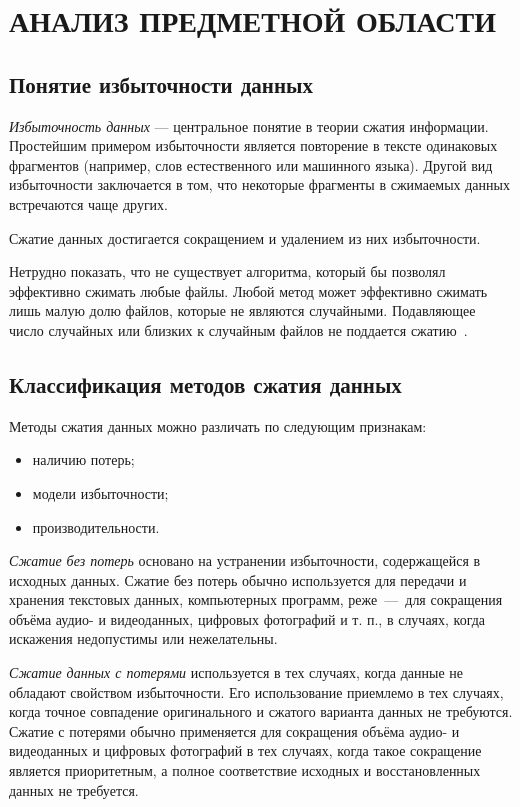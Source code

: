 \section[Анализ предметной области]{АНАЛИЗ ПРЕДМЕТНОЙ ОБЛАСТИ}

\subsection{Понятие избыточности данных}

\textit{Избыточность данных} --- центральное понятие в теории сжатия информации.
Простейшим примером избыточности является повторение в тексте одинаковых
фрагментов (например, слов естественного или машинного языка).
Другой вид избыточности заключается в том,
что некоторые фрагменты в сжимаемых данных встречаются чаще других.

Сжатие данных достигается сокращением и удалением из них
избыточности.

Нетрудно показать, что не существует алгоритма, который бы позволял
эффективно сжимать любые файлы.
Любой метод может эффективно сжимать лишь малую долю файлов,
которые не являются случайными. 
Подавляющее число случайных или близких к
случайным файлов не поддается сжатию~\cite{salmon2004}.

\subsection{Классификация методов сжатия данных}

Методы сжатия данных можно различать по следующим признакам:
\begin{itemize}
\item наличию потерь;
\item модели избыточности;
\item производительности.
\end{itemize}

\textit{Сжатие без потерь} основано на устранении избыточности, 
содержащейся в исходных данных. 
Сжатие без потерь обычно используется для передачи и хранения текстовых данных,
компьютерных программ, реже~---~для сокращения объёма аудио- и видеоданных,
цифровых фотографий и т. п., в случаях,
когда искажения недопустимы или нежелательны.

\textit{Сжатие данных с потерями} используется в тех случаях,
когда данные не обладают свойством избыточности. Его использование
приемлемо в тех случаях, когда точное совпадение оригинального и сжатого
варианта данных не требуются.
Сжатие с потерями обычно применяется для сокращения объёма аудио- и видеоданных
и цифровых фотографий в тех случаях, когда такое сокращение является
приоритетным, а полное соответствие исходных и восстановленных данных
не требуется.

